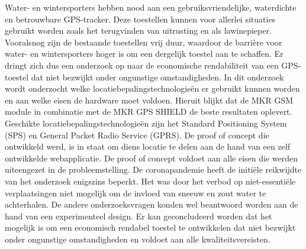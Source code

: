 Water- en wintersporters hebben nood aan een gebruiksvriendelijke, waterdichte en betrouwbare GPS-tracker. Deze toestellen kunnen voor allerlei situaties gebruikt worden zoals het terugvinden van uitrusting en als lawinepieper. Vooralsnog zijn de bestaande toestellen vrij duur, waardoor de barrière voor water- en wintersporters hoger is om een dergelijk toestel aan te schaffen. Er dringt zich dus een onderzoek op naar de economische rendabiliteit van een GPS-toestel dat niet bezwijkt onder ongunstige omstandigheden. In dit onderzoek wordt onderzocht welke locatiebepalingstechnologieën er gebruikt kunnen worden en aan welke eisen de hardware moet voldoen. Hieruit blijkt dat de MKR GSM module in combinatie met de MKR GPS SHIELD de beste resultaten oplevert. Geschikte locatiebepalingstechnologieën zijn het Standard Positioning System (SPS) en General Packet Radio Service (GPRS). De proof of concept die ontwikkeld werd, is in staat om diens locatie te delen aan de hand van een zelf ontwikkelde webapplicatie. De proof of concept voldoet aan alle eisen die werden uiteengezet in de probleemstelling. De coronapandemie heeft de initiële reikwijdte van het onderzoek enigszins beperkt. Het was door het verbod op niet-essentiële verplaatsingen niet mogelijk om de invloed van sneeuw en zout water te achterhalen. De andere onderzoeksvragen konden wel beantwoord worden aan de hand van een experimenteel design. Er kan geconcludeerd worden dat het mogelijk is om een economisch rendabel toestel te ontwikkelen dat niet bezwijkt onder ongunstige omstandigheden en voldoet aan alle kwaliteitsvereisten.